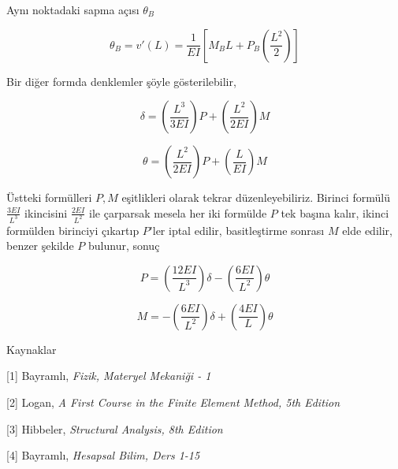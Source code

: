\documentclass[12pt,fleqn]{article}\usepackage{../../common}
\begin{document}
Aynı noktadaki sapma açısı $\theta_B$

$$
\theta_B = v'(L) =
\frac{1}{EI} \left[
M_B L + P_B \left( \frac{L^2}{2} \right) 
\right]
$$

Bir diğer formda denklemler şöyle gösterilebilir,

$$
\delta = \left( \frac{L^3}{3EI} \right) P +
\left( \frac{L^2}{2EI} \right) M
$$

$$
\theta = \left( \frac{L^2}{2EI} \right) P +
\left( \frac{L}{EI} \right) M
$$

Üstteki formülleri $P,M$ eşitlikleri olarak tekrar düzenleyebiliriz.
Birinci formülü $\frac{3EI}{L^3}$ ikincisini $\frac{2EI}{L^2}$ ile
çarparsak mesela her iki formülde $P$ tek başına kalır, ikinci formülden
birinciyi çıkartıp $P$'ler iptal edilir, basitleştirme sonrası $M$ elde
edilir, benzer şekilde $P$ bulunur, sonuç

$$
P = \left( \frac{12EI}{L^3}  \right) \delta -
\left(  \frac{6EI}{L^2} \right) \theta
$$

$$
M = - \left( \frac{6 EI}{L^2}  \right) \delta +
\left( \frac{4 EI}{L}  \right) \theta
$$

Kaynaklar

[1] Bayramlı, {\em Fizik, Materyel Mekaniği - 1}

[2] Logan, {\em A First Course in the Finite Element Method, 5th Edition}

[3] Hibbeler, {\em Structural Analysis, 8th Edition}

[4] Bayramlı, {\em Hesapsal Bilim, Ders 1-15}
\end{document}
